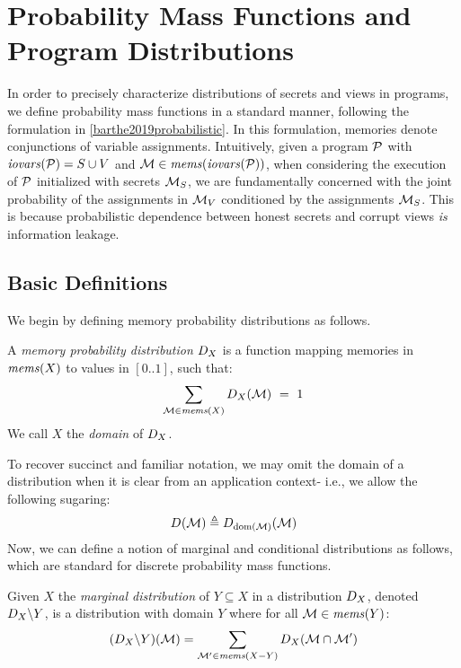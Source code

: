 \section{Probability Mass Functions and Program Distributions}
\label{section-pmf}

In order to precisely characterize distributions of secrets and views
in programs, we define probability mass functions in a standard manner,
following the formulation in \ref{barthe2019probabilistic}. In this formulation, memories
denote conjunctions of variable assignments. Intuitively, given a
program $\mathcal{P}$ with $\mathit{iovars}(\mathcal{P}) = S \cup V$ and $\mathcal{M} \in
\mathit{mems}(\mathit{iovars}(\mathcal{P}))$, when considering the execution of $\mathcal{P}$
initialized with secrets $\mathcal{M}_S$, we are fundamentally concerned
with the joint probability of the assignments in $\mathcal{M}_V$
conditioned by the assignments $\mathcal{M}_S$. This is because
probabilistic dependence between honest secrets and corrupt views
\emph{is} information leakage. 

\subsection{Basic Definitions} We begin by defining memory probability distributions as follows.
\begin{definition}
  A \emph{memory probability distribution} $D_{X}$ is a function
  mapping memories in $\mathit{mems}(X)$ to values in $[0..1]$, such that:
  $$
  \sum_{\mathcal{M} \in \mathit{mems}(X)} D_{X}(\mathcal{M}) \  = \ 1
  $$
  We call $X$ the \emph{domain} of $D_{X}$.
\end{definition}
To recover succinct and familiar notation, we may omit the domain of a
distribution when it is clear from an application context-
i.e., we allow the following sugaring:
$$
D_{}(\mathcal{M}) \triangleq D_{\mathrm{dom}(\mathcal{M})}(\mathcal{M})
$$
Now, we can define a notion of marginal and conditional
distributions as follows, which are standard for discrete
probability mass functions. 
\begin{definition}
  Given $X$ the \emph{marginal distribution} of $Y \subseteq X$
  in a distribution $D_{X}$, denoted $D_{X}\backslash Y$,
  is a distribution with domain $Y$ where for all
  $\mathcal{M} \in \mathit{mems}(Y)$:
  $$
  (D_{X}\backslash Y)(\mathcal{M}) =
  \sum_{\mathcal{M}' \in \mathit{mems}(X-Y)} D_{X}(\mathcal{M} \cap \mathcal{M}')
  $$
\end{definition}

